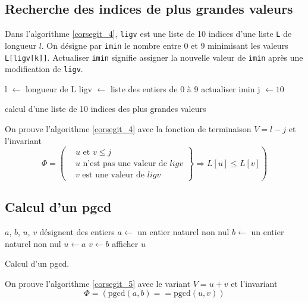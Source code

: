 \subsection{Recherche des indices de plus grandes valeurs}
Dans l'algorithme \ref{corsegit_4}, \texttt{ligv} est une liste de 10 indices d'une liste \texttt{L} de longueur $l$. On désigne par \texttt{imin} le nombre entre 0 et 9 minimisant les valeurs \texttt{L[ligv[k]]}. Actualiser \texttt{imin} signifie assigner la nouvelle valeur de \texttt{imin} après une modification de \texttt{ligv}.
\begin{algorithm}
  l $\leftarrow$ longueur de L\;
  ligv $\leftarrow$ liste des entiers de 0 à 9\;
  actualiser  imin\;
  j $\leftarrow 10$\;
  \caption{calcul d'une liste de 10 indices des plus grandes valeurs}
  \label{corsegit_4}
\end{algorithm}

On prouve l'algorithme \ref{corsegit_4} avec la fonction de terminaison $V = l-j$ et l'invariant
\begin{displaymath}
  \Phi = 
\left( 
\left. 
\begin{aligned}
  &u \text{ et } v \leq j\\
  &u \text{ n'est pas une valeur de }ligv \\
  &v \text{ est une valeur de }ligv 
\end{aligned}
\right\rbrace 
\Rightarrow L[u] \leq L[v]
\right) 
\end{displaymath}

\subsection{Calcul d'un pgcd}
\begin{algorithm}
  $a$, $b$, $u$, $v$  désignent des entiers\;
  $a\longleftarrow$ un entier naturel non nul\;
  $b\longleftarrow$ un entier naturel non nul\;
  $u\longleftarrow a$\;
  $v\longleftarrow b$\;
  afficher $u$\;
  \caption{Calcul d'un pgcd.}
  \label{corsegit_5}
\end{algorithm}
On prouve l'algorithme \ref{corsegit_5} avec le variant $V = u + v$ et l'invariant 
\begin{displaymath}
 \Phi = \left( \text{pgcd}(a,b) == \text{pgcd}(u,v)\right) 
\end{displaymath}


